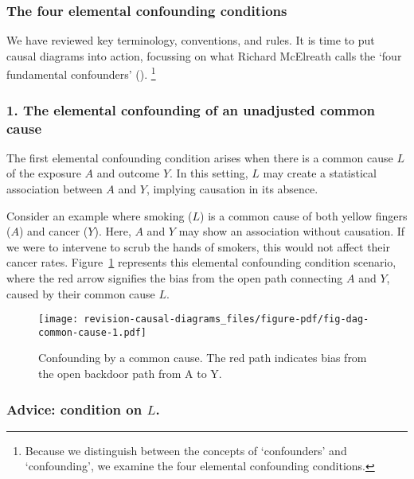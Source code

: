 \documentclass[
  singlecolumn,
  9pt]{article}
\begin{document}
\subsubsection{The four elemental confounding
conditions}\label{the-four-elemental-confounding-conditions}

We have reviewed key terminology, conventions, and rules. It is time to
put causal diagrams into action, focussing on what Richard McElreath
calls the `four fundamental confounders'
(). \footnote{Because
  we distinguish between the concepts of `confounders' and
  `confounding', we examine the four elemental confounding conditions.}

\subsubsection{1. The elemental confounding of an unadjusted common
cause}\label{the-elemental-confounding-of-an-unadjusted-common-cause}

The first elemental confounding condition arises when there is a common
cause \(L\) of the exposure \(A\) and outcome \(Y\). In this setting,
\(L\) may create a statistical association between \(A\) and \(Y\),
implying causation in its absence.

Consider an example where smoking (\(L\)) is a common cause of both
yellow fingers (\(A\)) and cancer (\(Y\)). Here, \(A\) and \(Y\) may
show an association without causation. If we were to intervene to scrub
the hands of smokers, this would not affect their cancer rates.
Figure~\ref{fig-dag-common-cause} represents this elemental confounding
condition scenario, where the red arrow signifies the bias from the open
path connecting \(A\) and \(Y\), caused by their common cause \(L\).

\begin{figure}

{\centering \texttt{[image: revision-causal-diagrams\_files/figure-pdf/fig-dag-common-cause-1.pdf]}

}

\caption{\label{fig-dag-common-cause}Confounding by a common cause. The
red path indicates bias from the open backdoor path from A to Y.}

\end{figure}

\subsubsection{\texorpdfstring{Advice: condition on
\(L\).}{Advice: condition on L.}}\label{advice-condition-on-l.}
\end{document}
